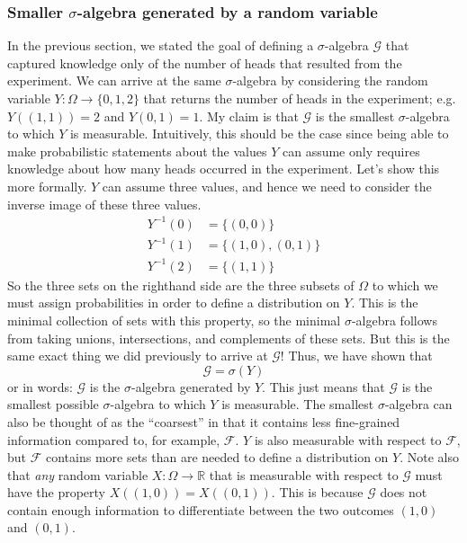 \documentclass[12pt]{article}
\newcommand{\R}{\mathbb{R}}
\begin{document}
\subsubsection{Smaller $\sigma$-algebra generated by a random variable}
In the previous section, we stated the goal of defining a $\sigma$-algebra $\mathcal{G}$ that captured knowledge only of the number of heads that resulted from the experiment. We can arrive at the same $\sigma$-algebra by 
considering the random variable $Y: \Omega \to \{0, 1, 2\}$ that returns the number of heads in the experiment; e.g. $Y((1, 1)) = 2$ and $Y(0, 1) = 1$. My claim is that $\mathcal{G}$ is the smallest $\sigma$-algebra to which $Y$
is measurable. Intuitively, this should be the case since being able to make probabilistic statements about the values $Y$ can assume only requires knowledge about how many heads occurred in the experiment. Let's show this more formally. $Y$ can assume three values, and hence we need to consider the inverse image of these three values. 
\begin{align*}
Y^{-1}(0) &= \{(0, 0)\} \\
Y^{-1}(1) &= \{(1, 0), (0, 1)\} \\
Y^{-1}(2) &= \{(1, 1)\}
\end{align*}
So the three sets on the righthand side are the three subsets of $\Omega$ to which we must assign probabilities in order to define a distribution on $Y$. This is the minimal collection of sets with this property, so the minimal 
$\sigma$-algebra follows from taking unions, intersections, and complements of these sets. But this is the same exact thing we did previously to arrive at $\mathcal{G}$! Thus, we have shown that 
\[\mathcal{G} = \sigma(Y)\]
or in words: $\mathcal{G}$ is the $\sigma$-algebra generated by $Y$. This just means that $\mathcal{G}$ is the smallest possible $\sigma$-algebra to which $Y$ is measurable. The smallest $\sigma$-algebra can also be 
thought of as the ``coarsest'' in that it contains less fine-grained information compared to, for example, $\mathcal{F}$. $Y$ is also measurable with respect to $\mathcal{F}$, but $\mathcal{F}$ contains more sets than are needed 
to define a distribution on $Y$. Note also that \textit{any} random variable $X: \mathcal{\Omega} \to \R$ that is measurable with respect to $\mathcal{G}$ must have the property $X((1, 0)) = X((0, 1))$. This is because $\mathcal{G}$
does not contain enough information to differentiate between the two outcomes $(1, 0)$ and $(0, 1)$. 
\end{document}
